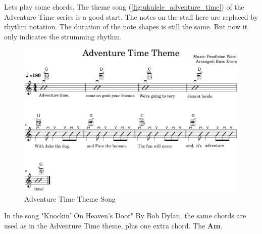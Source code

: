 \clearpage

Lets play some chords. The theme song (\autoref{fig:ukulele_adventure_time}) of the Adventure Time series is a good start. The notes on the staff here are replaced by rhythm notation. The duration of the note shapes is still the same. But now it only indicates the strumming rhythm.

\begin{figure}[h]
	\centering
	\includegraphics[width=\textwidth]{../../MuseScore/Ukulele/UkuleleAdventureTimeTheme.png}
	\caption{Adventure Time Theme Song}
	\label{fig:ukulele_adventure_time}
\end{figure}

\newpage

In the song "Knockin' On Heaven's Door" By Bob Dylan, the same chords are used as in the Adventure Time theme, plus one extra chord. The \textbf{Am}.

